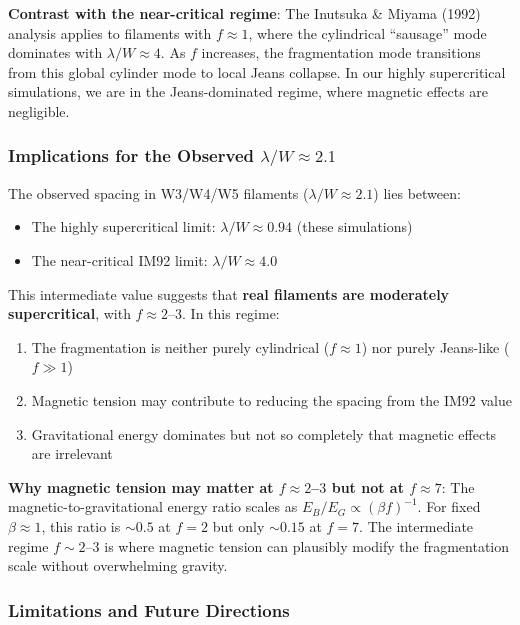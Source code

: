 \documentclass[11pt,a4paper]{article}
\begin{document}
\textbf{Contrast with the near-critical regime}: The Inutsuka \& Miyama (1992) analysis applies to filaments with $f \approx 1$, where the cylindrical ``sausage'' mode dominates with $\lambda/W \approx 4$. As $f$ increases, the fragmentation mode transitions from this global cylinder mode to local Jeans collapse. In our highly supercritical simulations, we are in the Jeans-dominated regime, where magnetic effects are negligible.

\subsubsection{Implications for the Observed $\lambda/W \approx 2.1$}

The observed spacing in W3/W4/W5 filaments ($\lambda/W \approx 2.1$) lies between:
\begin{itemize}
    \item The highly supercritical limit: $\lambda/W \approx 0.94$ (these simulations)
    \item The near-critical IM92 limit: $\lambda/W \approx 4.0$
\end{itemize}

This intermediate value suggests that \textbf{real filaments are moderately supercritical}, with $f \approx 2$--$3$. In this regime:
\begin{enumerate}
    \item The fragmentation is neither purely cylindrical ($f \approx 1$) nor purely Jeans-like ($f \gg 1$)
    \item Magnetic tension may contribute to reducing the spacing from the IM92 value
    \item Gravitational energy dominates but not so completely that magnetic effects are irrelevant
\end{enumerate}

\textbf{Why magnetic tension may matter at $f \approx 2$--$3$ but not at $f \approx 7$}: The magnetic-to-gravitational energy ratio scales as $E_B/E_G \propto (\beta f)^{-1}$. For fixed $\beta \approx 1$, this ratio is $\sim 0.5$ at $f = 2$ but only $\sim 0.15$ at $f = 7$. The intermediate regime $f \sim 2$--$3$ is where magnetic tension can plausibly modify the fragmentation scale without overwhelming gravity.

\subsubsection{Limitations and Future Directions}
\end{document}
